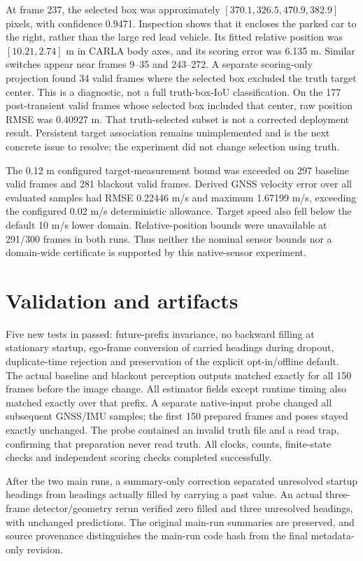 \documentclass[11pt]{article}
\begin{document}
At frame 237, the selected box was approximately
$[370.1,326.5,470.9,382.9]$ pixels, with confidence 0.9471. Inspection shows
that it encloses the parked car to the right, rather than the large red lead
vehicle. Its fitted relative position was $[10.21,2.74]$ m in CARLA body axes,
and its scoring error was 6.135 m. Similar switches appear near frames 9--35
and 243--272. A separate scoring-only projection found 34 valid frames where
the selected box excluded the truth target center. This is a diagnostic,
not a full truth-box-IoU classification. On the 177 post-transient valid
frames whose selected box included that center, raw position RMSE was
0.40927 m. That truth-selected subset is not a corrected deployment result.
Persistent target association remains unimplemented and is the next concrete
issue to resolve; the experiment did not change selection using truth.

The 0.12 m configured target-measurement bound was exceeded on 297 baseline
valid frames and 281 blackout valid frames. Derived GNSS velocity error over
all evaluated samples had RMSE 0.22446 m/s and maximum 1.67199 m/s, exceeding
the configured 0.02 m/s deterministic allowance. Target speed also fell below
the default 10 m/s lower domain. Relative-position bounds were unavailable
at 291/300 frames in both runs. Thus neither the nominal sensor bounds nor a
domain-wide certificate is supported by this native-sensor experiment.

\section{Validation and artifacts}
Five new tests in  passed: future-prefix
invariance, no backward filling at stationary startup, ego-frame conversion of
carried headings during dropout, duplicate-time rejection and preservation
of the explicit opt-in/offline default.
The actual baseline and blackout perception outputs matched exactly for all
150 frames before the image change. All estimator fields except runtime
timing also matched exactly over that prefix. A separate native-input probe
changed all subsequent GNSS/IMU samples; the first 150 prepared frames and
poses stayed exactly unchanged. The probe contained an invalid truth file and
a read trap, confirming that preparation never read truth. All clocks, counts,
finite-state checks and independent scoring checks completed successfully.

After the two main runs, a summary-only correction separated unresolved
startup headings from headings actually filled by carrying a past value.
An actual three-frame detector/geometry rerun verified zero filled and three
unresolved headings, with unchanged predictions. The original main-run
summaries are preserved, and source provenance distinguishes the main-run
code hash from the final metadata-only revision.
\end{document}
